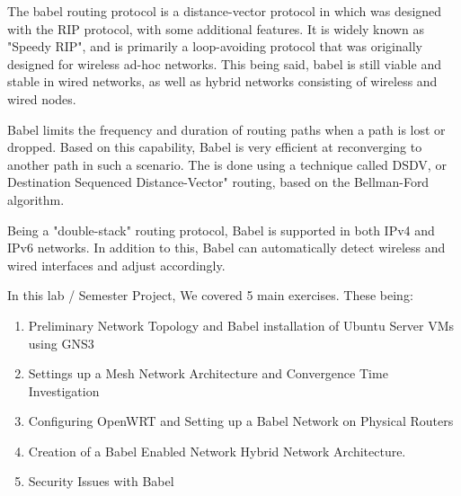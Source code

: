 \documentclass[main.tex]{subfiles}
\begin{document}
\hfill \break
The babel routing protocol is a distance-vector protocol in which was designed with the RIP protocol, with some additional features. It is widely known as "Speedy RIP", and is primarily a loop-avoiding protocol that was originally designed for wireless ad-hoc networks. This being said, babel is still viable and stable in wired networks, as well as hybrid networks consisting of wireless and wired nodes. 

Babel limits the frequency and duration of routing paths when a path is lost or dropped. Based on this capability, Babel is very efficient at reconverging to another path in such a scenario. The is done using a technique called DSDV, or Destination Sequenced Distance-Vector" routing, based on the Bellman-Ford algorithm.

Being a "double-stack" routing protocol, Babel is supported in both IPv4 and IPv6 networks. In addition to this, Babel can automatically detect wireless and wired interfaces and adjust accordingly.

In this lab / Semester Project, We covered 5 main exercises. These being:

\begin{enumerate}
    \item Preliminary Network Topology and Babel installation of Ubuntu Server VMs using GNS3
    \item Settings up a Mesh Network Architecture and Convergence Time Investigation
    \item Configuring OpenWRT and Setting up a Babel Network on Physical Routers
    \item Creation of a Babel Enabled Network Hybrid Network Architecture.
    \item Security Issues with Babel
\end{enumerate}
\end{document}
